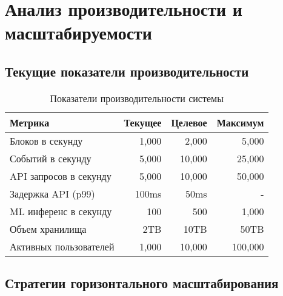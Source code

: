 \documentclass[a4paper,11pt]{article}
\begin{document}
\newpage

\section{Анализ производительности и масштабируемости}

\subsection{Текущие показатели производительности}

\begin{table}[H]
\centering
\begin{tabularx}{\textwidth}{|X|r|r|r|}
\hline
\textbf{Метрика} & \textbf{Текущее} & \textbf{Целевое} & \textbf{Максимум} \\
\hline
Блоков в секунду & 1,000 & 2,000 & 5,000 \\
Событий в секунду & 5,000 & 10,000 & 25,000 \\
API запросов в секунду & 5,000 & 10,000 & 50,000 \\
Задержка API (p99) & 100ms & 50ms & - \\
ML инференс в секунду & 100 & 500 & 1,000 \\
Объем хранилища & 2TB & 10TB & 50TB \\
Активных пользователей & 1,000 & 10,000 & 100,000 \\
\hline
\end{tabularx}
\caption{Показатели производительности системы}
\end{table}

\subsection{Стратегии горизонтального масштабирования}
\end{document}
